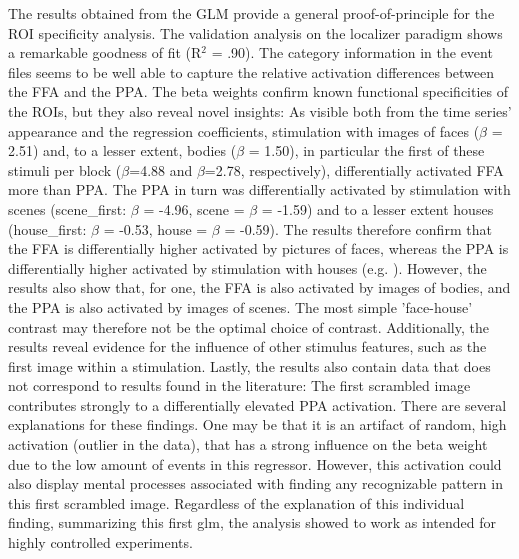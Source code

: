 \documentclass[a4paper, 12pt]{scrreprt}
\begin{document}
The results obtained from the GLM provide a general proof-of-principle for the ROI specificity analysis. The validation analysis on the localizer paradigm shows a remarkable goodness of fit (R$^2$ = .90). The category information in the event files seems to be well able to capture the relative activation differences between the FFA and the PPA. The beta weights confirm known functional specificities of the ROIs, but they also reveal novel insights: As visible both from the time series' appearance and the regression coefficients, stimulation with images of faces ($\beta$ = 2.51) and, to a lesser extent, bodies ($\beta$ = 1.50), in particular the first of these stimuli per block ($\beta$=4.88 and $\beta$=2.78, respectively), differentially activated FFA more than PPA. The PPA in turn was differentially activated by stimulation with scenes (scene\_first: $\beta$ = -4.96, scene = $\beta$ = -1.59) and to a lesser extent houses (house\_first: $\beta$ = -0.53, house = $\beta$ = -0.59). The results therefore confirm that the FFA is differentially higher activated by pictures of faces, whereas the PPA is differentially higher activated by stimulation with houses (e.g. \cite{fox2009defining}). However, the results also show that, for one, the FFA is also activated by images of bodies, and the PPA is also activated by images of scenes. The most simple 'face-house' contrast may therefore not be the optimal choice of contrast. Additionally, the results reveal evidence for the influence of other stimulus features, such as the first image within a stimulation. Lastly, the results also contain data that does not correspond to results found in the literature: The first scrambled image contributes strongly to a differentially elevated PPA activation. There are several explanations for these findings. One may be that it is an artifact of random, high activation (outlier in the data), that has a strong influence on the beta weight due to the low amount of events in this regressor. However, this activation could also display mental processes associated with finding any recognizable pattern in this first scrambled image. Regardless of the explanation of this individual finding, summarizing this first glm, the analysis showed to work as intended for highly controlled experiments.
\newline
\end{document}
